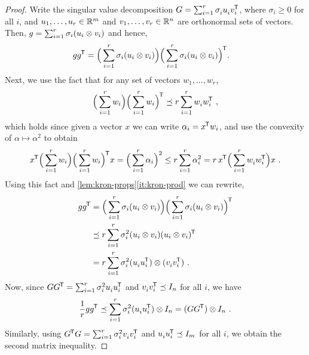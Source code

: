 \begin{proof}
Write the singular value decomposition $G = \sum_{i=1}^r \sigma_i^{} u_i^{} v_i\tr$,
where $\sigma_i \ge 0$ for all $i$, and $u_1,\ldots,u_r \in \reals^{m}$ and
$v_1,\ldots,v_r \in \reals^{n}$ are orthonormal sets of vectors.
Then,
$g = \sum_{i=1}^r \sigma_i (u_i \kron v_i)$
and hence,
\begin{align*}
gg\tr
&=
\LR{\sum_{i=1}^r \sigma_i (u_i \kron v_i)}\LR{\sum_{i=1}^r \sigma_i (u_i \kron v_i)}\tr
.
\end{align*}
Next, we use the fact that for any set of vectors $w_1,\ldots,w_r$,
$$ \LR{\sum_{i=1}^r w_i}\LR{\sum_{i=1}^r w_i}\tr \preceq r \sum_{i=1}^r w_i^{} w_i\tr ~,$$
which holds since given a vector $x$ we can write $\alpha_i = x\tr w_i$, and
use the convexity of $\alpha \mapsto \alpha^2$ to obtain
$$
x\tr \LR{\sum_{i=1}^r w_i}\LR{\sum_{i=1}^r w_i}\tr x
=
\LR{\sum_{i=1}^r \alpha_i}^2
\le
r \sum_{i=1}^r \alpha_i^2
=
r \, x\tr \LR{\sum_{i=1}^r w_i^{} w_i\tr} x ~
.
$$
Using this fact and \cref{lem:kron-props}\ref{it:kron-prod} we can rewrite,
\begin{align*}
gg\tr
&=
\LR{\sum_{i=1}^r \sigma_i (u_i \kron v_i)}\LR{\sum_{i=1}^r \sigma_i (u_i \kron v_i)}\tr \\
&\preceq
r \sum_{i=1}^r \sigma_i^2 (u_i \kron v_i)(u_i \kron v_i)\tr
\\
&=
r \sum_{i=1}^r \sigma_i^2 (u_i^{} u_i\tr) \kron (v_i^{} v_i\tr)
~.
\end{align*}
Now, since
$GG\tr = \sum_{i=1}^r \sigma_i^2 u_i^{} u_i\tr$
and $v_i^{} v_i\tr \preceq I_{n}$ for all $i$, we have
\begin{align*}
\frac{1}{r} gg\tr
\preceq
\sum_{i=1}^r \sigma_i^2 (u_i^{} u_i\tr) \kron I_{n}
=
(GG\tr) \kron I_{n} ~ .
\end{align*}
Similarly, using $G\tr G = \sum_{i=1}^r \sigma_i^2 v_i^{} v_i\tr$ and
$u_i^{} u_i\tr \preceq I_{m}$ for all $i$, we
obtain the second matrix inequality.
\end{proof}



